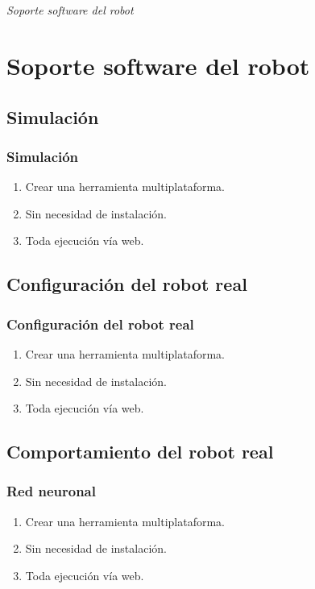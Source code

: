 \documentclass{beamer}
\begin{document}

\section*{}
\begin{frame}{}
	\centering \Huge
	\emph{Soporte software del robot}
\end{frame}

\section{Soporte software del robot}
\subsection{Simulación}
\begin{frame}
	\frametitle{Simulación}
	\begin{enumerate}
		\item Crear una herramienta multiplataforma.
		\item Sin necesidad de instalación.
		\item Toda ejecución vía web.
	\end{enumerate}
\end{frame}

\subsection{Configuración del robot real}

\begin{frame}
	\frametitle{Configuración del robot real}
	\begin{enumerate}
		\item Crear una herramienta multiplataforma.
		\item Sin necesidad de instalación.
		\item Toda ejecución vía web.
	\end{enumerate}
\end{frame}

\subsection{Comportamiento del robot real}
\begin{frame}
	\frametitle{Red neuronal}
	\begin{enumerate}
		\item Crear una herramienta multiplataforma.
		\item Sin necesidad de instalación.
		\item Toda ejecución vía web.
	\end{enumerate}
\end{frame}
\end{document}
